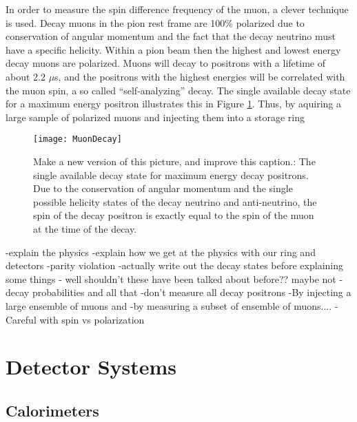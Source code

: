 In order to measure the spin difference frequency of the muon, a clever technique is used. Decay muons in the pion rest frame are 100\% polarized due to conservation of angular momentum and the fact that the decay neutrino must have a specific helicity. Within a pion beam then the highest and lowest energy decay muons are polarized. Muons will 
decay to positrons with a lifetime of about 2.2 $\mu$s, and the positrons with the highest energies will be correlated with the muon spin, a so called ``self-analyzing'' decay. The single available decay state for a maximum energy positron illustrates this in Figure \ref{fig:MuonDecay}. Thus, by aquiring a large sample of polarized muons and injecting them into a storage ring 

\begin{figure}[]
	\caption[Muon Decay - Max Energy Positron]{Make a new version of this picture, and improve this caption.: The single available decay state for maximum energy decay positrons. Due to the conservation of angular momentum and the single possible helicity states of the decay neutrino and anti-neutrino, the spin of the decay positron is exactly equal to the spin of the muon at the time of the decay.}
	\centering
	\texttt{[image: MuonDecay]}
	\label{fig:MuonDecay}
\end{figure}



-explain the physics
-explain how we get at the physics with our ring and detectors
-parity violation
-actually write out the decay states before explaining some things - well shouldn't these have been talked about before?? maybe not
-decay probabilities and all that
-don't measure all decay positrons
-By injecting a large ensemble of muons and 
-by measuring a subset of ensemble of muons....
-Careful with spin vs polarization









\section{Detector Systems}
\label{sec:DetectorSystems}


\subsection{Calorimeters}
\label{sec:Calorimeters}



